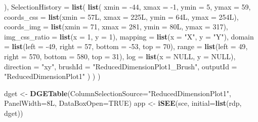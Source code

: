 \documentclass[
]{book}
\newenvironment{Shaded}{\begin{snugshade}}{\end{snugshade}}
\newcommand{\DataTypeTok}[1]{\textcolor[rgb]{0.13,0.29,0.53}{#1}}
\newcommand{\DecValTok}[1]{\textcolor[rgb]{0.00,0.00,0.81}{#1}}
\newcommand{\KeywordTok}[1]{\textcolor[rgb]{0.13,0.29,0.53}{\textbf{#1}}}
\newcommand{\NormalTok}[1]{#1}
\newcommand{\OtherTok}[1]{\textcolor[rgb]{0.56,0.35,0.01}{#1}}
\newcommand{\StringTok}[1]{\textcolor[rgb]{0.31,0.60,0.02}{#1}}
\begin{document}
\begin{Shaded}
\begin{Highlighting}[]
\NormalTok{    ),}
    \DataTypeTok{SelectionHistory =} \KeywordTok{list}\NormalTok{(}
        \KeywordTok{list}\NormalTok{(}
            \DataTypeTok{xmin =} \DecValTok{-44}\NormalTok{, }\DataTypeTok{xmax =} \DecValTok{-1}\NormalTok{, }\DataTypeTok{ymin =} \DecValTok{5}\NormalTok{, }\DataTypeTok{ymax =} \DecValTok{59}\NormalTok{, }
            \DataTypeTok{coords_css =} \KeywordTok{list}\NormalTok{(}\DataTypeTok{xmin =}\NormalTok{ 57L, }\DataTypeTok{xmax =}\NormalTok{ 225L, }\DataTypeTok{ymin =}\NormalTok{ 64L, }\DataTypeTok{ymax =}\NormalTok{ 254L), }
            \DataTypeTok{coords_img =} \KeywordTok{list}\NormalTok{(}\DataTypeTok{xmin =} \DecValTok{71}\NormalTok{, }\DataTypeTok{xmax =} \DecValTok{281}\NormalTok{, }\DataTypeTok{ymin =}\NormalTok{ 80L, }\DataTypeTok{ymax =} \DecValTok{317}\NormalTok{), }
            \DataTypeTok{img_css_ratio =} \KeywordTok{list}\NormalTok{(}\DataTypeTok{x =} \DecValTok{1}\NormalTok{, }\DataTypeTok{y =} \DecValTok{1}\NormalTok{), }
            \DataTypeTok{mapping =} \KeywordTok{list}\NormalTok{(}\DataTypeTok{x =} \StringTok{"X"}\NormalTok{, }\DataTypeTok{y =} \StringTok{"Y"}\NormalTok{), }
            \DataTypeTok{domain =} \KeywordTok{list}\NormalTok{(}\DataTypeTok{left =} \DecValTok{-49}\NormalTok{, }\DataTypeTok{right =} \DecValTok{57}\NormalTok{, }\DataTypeTok{bottom =} \DecValTok{-53}\NormalTok{, }\DataTypeTok{top =} \DecValTok{70}\NormalTok{), }
            \DataTypeTok{range =} \KeywordTok{list}\NormalTok{(}\DataTypeTok{left =} \DecValTok{49}\NormalTok{, }\DataTypeTok{right =} \DecValTok{570}\NormalTok{, }\DataTypeTok{bottom =} \DecValTok{580}\NormalTok{, }\DataTypeTok{top =} \DecValTok{31}\NormalTok{), }
            \DataTypeTok{log =} \KeywordTok{list}\NormalTok{(}\DataTypeTok{x =} \OtherTok{NULL}\NormalTok{, }\DataTypeTok{y =} \OtherTok{NULL}\NormalTok{), }
            \DataTypeTok{direction =} \StringTok{"xy"}\NormalTok{, }\DataTypeTok{brushId =} \StringTok{"ReducedDimensionPlot1_Brush"}\NormalTok{, }
            \DataTypeTok{outputId =} \StringTok{"ReducedDimensionPlot1"}
\NormalTok{        )}
\NormalTok{    )}
\NormalTok{) }

\NormalTok{dget <-}\StringTok{ }\KeywordTok{DGETable}\NormalTok{(}\DataTypeTok{ColumnSelectionSource=}\StringTok{"ReducedDimensionPlot1"}\NormalTok{, }
    \DataTypeTok{PanelWidth=}\NormalTok{8L, }\DataTypeTok{DataBoxOpen=}\OtherTok{TRUE}\NormalTok{)}
\NormalTok{app <-}\StringTok{ }\KeywordTok{iSEE}\NormalTok{(sce, }\DataTypeTok{initial=}\KeywordTok{list}\NormalTok{(rdp, dget))}
\end{Highlighting}
\end{Shaded}
\end{document}
